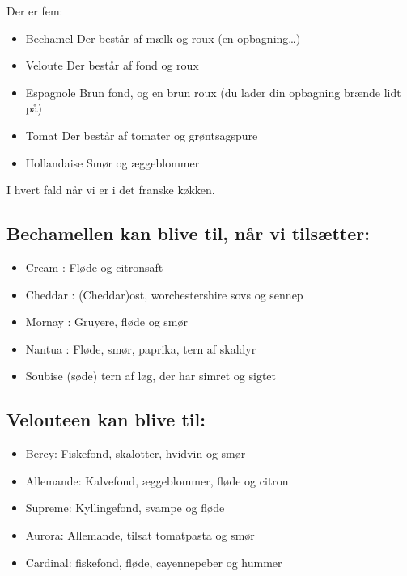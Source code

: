 \documentclass[
]{book}
\providecommand{\tightlist}{%
  \setlength{\itemsep}{0pt}\setlength{\parskip}{0pt}}
\begin{document}
Der er fem:

\begin{itemize}
\tightlist
\item
  Bechamel Der består af mælk og roux (en opbagning\ldots)
\item
  Veloute Der består af fond og roux
\item
  Espagnole Brun fond, og en brun roux (du lader din opbagning brænde lidt på)
\item
  Tomat Der består af tomater og grøntsagspure
\item
  Hollandaise Smør og æggeblommer
\end{itemize}

I hvert fald når vi er i det franske køkken.

\subsection{Bechamellen kan blive til, når vi tilsætter:}\label{bechamellen-kan-blive-til-nuxe5r-vi-tilsuxe6tter}

\begin{itemize}
\tightlist
\item
  Cream : Fløde og citronsaft
\item
  Cheddar : (Cheddar)ost, worchestershire sovs og sennep
\item
  Mornay : Gruyere, fløde og smør
\item
  Nantua : Fløde, smør, paprika, tern af skaldyr
\item
  Soubise (søde) tern af løg, der har simret og sigtet
\end{itemize}

\subsection{Velouteen kan blive til:}\label{velouteen-kan-blive-til}

\begin{itemize}
\tightlist
\item
  Bercy: Fiskefond, skalotter, hvidvin og smør
\item
  Allemande: Kalvefond, æggeblommer, fløde og citron
\item
  Supreme: Kyllingefond, svampe og fløde
\item
  Aurora: Allemande, tilsat tomatpasta og smør
\item
  Cardinal: fiskefond, fløde, cayennepeber og hummer
\end{itemize}
\end{document}
